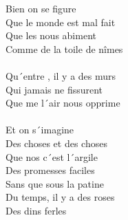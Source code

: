 Bien  on se figure \\
Que le monde est mal fait \\
Que les  nous abiment \\
Comme de la toile de nîmes \\
~\\
Qu´entre , il y a des murs \\
Qui jamais ne fissurent \\
Que me l´air nous opprime \\
~\\
Et  on s´imagine \\
Des choses et des choses \\
Que nos  c´est l´argile \\
Des promesses faciles \\
Sans  que sous la patine \\
Du temps, il y a des roses \\
Des dins ferles   